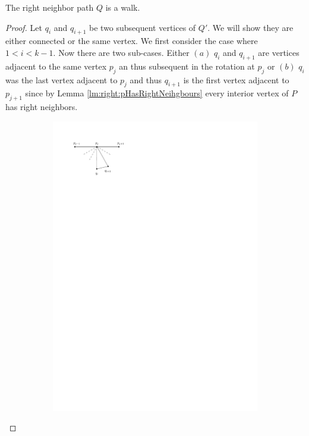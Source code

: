   \begin{lemma}
    \label{lm:uni:neighborWalk}
    The right neighbor path $Q$ is a walk.
  \end{lemma}
  \begin{proof}
    Let $q_i$ and $q_{i+1}$ be two subsequent vertices of $Q'$. We will show they are either connected or the same vertex. We first consider the case where $1 < i < k-1$.
    Now there are two sub-cases. Either $(a)$ $q_i$ and $ q_{i+1}$ are vertices adjacent to the same vertex $p_j$ an thus subsequent in the rotation at $p_j$ or $(b)$ $q_i$ was the last vertex adjacent to $p_j$ and thus $q_{i+1}$ is the first vertex adjacent to $p_{j+1}$ since by Lemma \ref{lm:right:pHasRightNeihgbours} every interior vertex of $P$ has right neighbors.

    \begin{figure}[h]
      \centering
      \begin{subfigure}[b]{0.5\linewidth}
          \includegraphics[width=\linewidth]{unifiedAlgo/img/walkProofA}

\end{subfigure}
\end{figure}
\end{proof}
